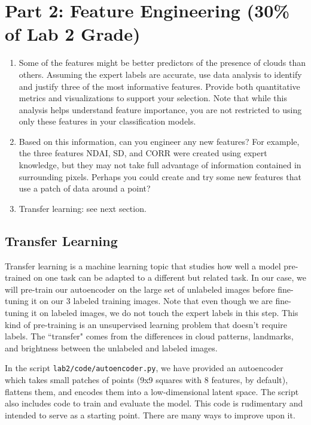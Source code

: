 \documentclass[letterpaper,12pt]{article}
\begin{document}
\section*{Part 2: Feature Engineering (30\% of Lab 2 Grade)}
\begin{enumerate}
    \item Some of the features might be better predictors of the presence of clouds than others. Assuming the expert labels are accurate, use data analysis to identify and justify three of the most informative features. Provide both quantitative metrics and visualizations to support your selection. Note that while this analysis helps understand feature importance, you are not restricted to using only these features in your classification models.
    \item Based on this information, can you engineer any new features? For example, the three features NDAI, SD, and CORR were created using expert knowledge, but they may not take full advantage of information contained in surrounding pixels. Perhaps you could create and try some new features that use a patch of data around a point?
    \item Transfer learning: see next section.
\end{enumerate}

\subsection{Transfer Learning}

Transfer learning is a machine learning topic that studies how well a model pre-trained on one task can be adapted to a different but related task. In our case, we will pre-train our autoencoder on the large set of unlabeled images before fine-tuning it on our 3 labeled training images. Note that even though we are fine-tuning it on labeled images, we do not touch the expert labels in this step. This kind of pre-training is an unsupervised learning problem that doesn't require labels. The ``transfer" comes from the differences in cloud patterns, landmarks, and brightness between the unlabeled and labeled images.

In the script \texttt{lab2/code/autoencoder.py}, we have provided an autoencoder which takes small patches of points (9x9 squares with 8 features, by default), flattens them, and encodes them into a low-dimensional latent space. The script also includes code to train and evaluate the model. This code is rudimentary and intended to serve as a starting point. There are many ways to improve upon it.
\end{document}

